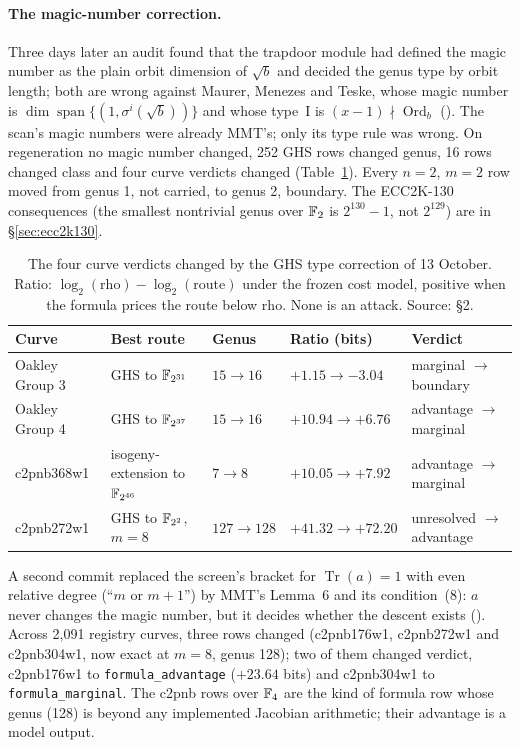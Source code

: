 \paragraph{The magic-number correction.} Three days later an audit found
that the trapdoor module had defined the magic number as the plain orbit
dimension of $\sqrt b$ and decided the genus type by orbit length; both are
wrong against Maurer, Menezes and Teske, whose magic number is
$\dim\operatorname{span}\{(1,\sigma^i(\sqrt b))\}$ and whose type~I is
$(x-1)\nmid\operatorname{Ord}_b$ ().
The scan's magic numbers were already MMT's; only its type rule was wrong.
On regeneration no magic number changed, 252 GHS rows changed genus, 16
rows changed class and four curve verdicts changed
(Table~\ref{tab:ghs-mmt}). Every $n=2$, $m=2$ row moved from genus 1, not
carried, to genus 2, boundary. The ECC2K-130 consequences (the smallest
nontrivial genus over $\mathbb{F}_2$ is $2^{130}-1$, not $2^{129}$) are in
\S\ref{sec:ecc2k130}.

\begin{table}[t]
\centering\small
\begin{tabular}{@{}lllll@{}}
\toprule
Curve & Best route & Genus & Ratio (bits) & Verdict \\
\midrule
Oakley Group 3 & GHS to $\mathbb{F}_{2^{31}}$ & $15\to16$ & $+1.15\to-3.04$ & marginal $\to$ boundary \\
Oakley Group 4 & GHS to $\mathbb{F}_{2^{37}}$ & $15\to16$ & $+10.94\to+6.76$ & advantage $\to$ marginal \\
c2pnb368w1 & isogeny-extension to $\mathbb{F}_{2^{46}}$ & $7\to8$ & $+10.05\to+7.92$ & advantage $\to$ marginal \\
c2pnb272w1 & GHS to $\mathbb{F}_{2^2}$, $m=8$ & $127\to128$ & $+41.32\to+72.20$ & unresolved $\to$ advantage \\
\bottomrule
\end{tabular}
\caption[]{The four curve verdicts changed by the GHS type correction of
13 October. Ratio: $\log_2(\text{rho})-\log_2(\text{route})$ under the
frozen cost model, positive when the formula prices the route below rho.
None is an attack. Source:
 \S2.}
\label{tab:ghs-mmt}
\end{table}

A second commit replaced the screen's bracket for $\operatorname{Tr}(a)=1$
with even relative degree (``$m$ or $m+1$'') by MMT's Lemma~6 and its
condition~(8): $a$ never changes the magic number, but it decides whether
the descent exists ().
Across 2{,}091 registry curves, three rows changed (c2pnb176w1, c2pnb272w1
and c2pnb304w1, now exact at $m=8$, genus 128); two of them changed
verdict, c2pnb176w1 to \texttt{formula\_advantage} ($+23.64$ bits) and
c2pnb304w1 to \texttt{formula\_marginal}. The c2pnb rows over $\mathbb{F}_4$ are
the kind of formula row whose genus (128) is beyond any implemented
Jacobian arithmetic; their advantage is a model output.

